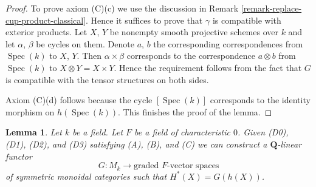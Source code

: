 \documentclass{stacks-project}
\theoremstyle{plain}
\newtheorem{lemma}[subsection]{Lemma}
\theoremstyle{definition}
\theoremstyle{remark}
\numberwithin{equation}{subsection}
\def\Spec{\mathop{\mathrm{Spec}}}
\begin{document}
\begin{proof}
\medskip\noindent
To prove axiom (C)(c) we use the discussion in
Remark \ref{remark-replace-cup-product-classical}.
Hence it suffices to prove that $\gamma$ is compatible with
exterior products. Let $X$, $Y$ be nonempty smooth projective
schemes over $k$ and let $\alpha$, $\beta$ be cycles on them. Denote
$a$, $b$ the corresponding correspondences from $\Spec(k)$ to
$X$, $Y$. Then $\alpha \times \beta$ corresponds to the
correspondence $a \otimes b$ from $\Spec(k)$ to $X \otimes Y = X \times Y$.
Hence the requirement follows from the fact that $G$ is
compatible with the tensor structures on both sides.

\medskip\noindent
Axiom (C)(d) follows because the cycle $[\Spec(k)]$
corresponds to the identity morphism on $h(\Spec(k))$.
This finishes the proof of the lemma.
\end{proof}

\begin{lemma}
\label{lemma-from-weil-to-functor}
Let $k$ be a field. Let $F$ be a field of characteristic $0$. Given
(D0), (D1), (D2), and (D3) satisfying (A), (B), and (C)
we can construct a $\mathbf{Q}$-linear functor
$$
G : M_k \longrightarrow \text{graded }F\text{-vector spaces}
$$
of symmetric monoidal categories such that $H^*(X) = G(h(X))$.
\end{lemma}
\end{document}
